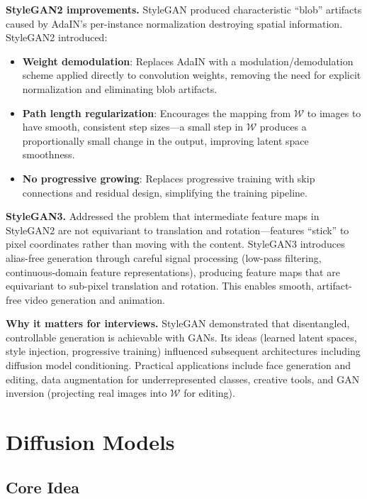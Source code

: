 \textbf{StyleGAN2 improvements.} StyleGAN produced characteristic ``blob'' artifacts caused by AdaIN's per-instance normalization destroying spatial information. StyleGAN2 introduced:
\begin{itemize}
    \item \textbf{Weight demodulation}: Replaces AdaIN with a modulation/demodulation scheme applied directly to convolution weights, removing the need for explicit normalization and eliminating blob artifacts.
    \item \textbf{Path length regularization}: Encourages the mapping from $\mathcal{W}$ to images to have smooth, consistent step sizes---a small step in $\mathcal{W}$ produces a proportionally small change in the output, improving latent space smoothness.
    \item \textbf{No progressive growing}: Replaces progressive training with skip connections and residual design, simplifying the training pipeline.
\end{itemize}

\textbf{StyleGAN3.} Addressed the problem that intermediate feature maps in StyleGAN2 are not equivariant to translation and rotation---features ``stick'' to pixel coordinates rather than moving with the content. StyleGAN3 introduces alias-free generation through careful signal processing (low-pass filtering, continuous-domain feature representations), producing feature maps that are equivariant to sub-pixel translation and rotation. This enables smooth, artifact-free video generation and animation.

\textbf{Why it matters for interviews.} StyleGAN demonstrated that disentangled, controllable generation is achievable with GANs. Its ideas (learned latent spaces, style injection, progressive training) influenced subsequent architectures including diffusion model conditioning. Practical applications include face generation and editing, data augmentation for underrepresented classes, creative tools, and GAN inversion (projecting real images into $\mathcal{W}$ for editing).

\section{Diffusion Models}
\label{sec:diffusion}

\subsection{Core Idea}


